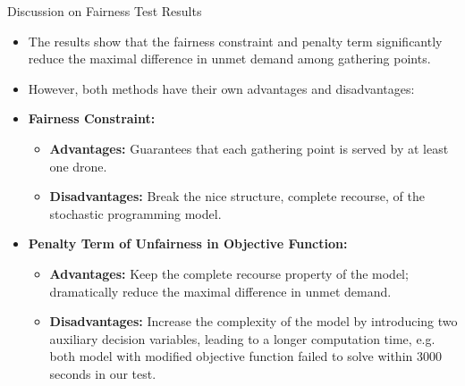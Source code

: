 \documentclass[aspectratio=169]{beamer}
\begin{document}
\begin{frame}{Discussion on Fairness Test Results}
\begin{itemize}[label=$\cdot$]
    \item The results show that the fairness constraint and penalty term significantly reduce the maximal difference in unmet demand among gathering points.
    \item However, both methods have their own advantages and disadvantages:
    \item \textbf{Fairness Constraint:} \\
    \begin{itemize}
        \item \textbf{Advantages:} Guarantees that each gathering point is served by at least one drone.
        \item \textbf{Disadvantages:} Break the nice structure, complete recourse, of the stochastic programming model.
    \end{itemize}
    \item \textbf{Penalty Term of Unfairness in Objective Function:} 
    \begin{itemize}
        \item \textbf{Advantages:} Keep the complete recourse property of the model; dramatically reduce the maximal difference in unmet demand.
        \item \textbf{Disadvantages:} Increase the complexity of the model by introducing two auxiliary decision variables, leading to a longer computation time, e.g. both model with modified objective function failed to solve within 3000 seconds in our test.
    \end{itemize}
\end{itemize}
\end{frame}
\end{document}

